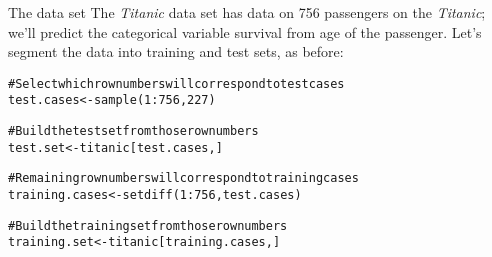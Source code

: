 \documentclass{beamer}\usepackage[]{graphicx}\usepackage[]{color}
\makeatletter
\newcommand{\hlnum}[1]{\textcolor[rgb]{0.824,0.412,0.118}{#1}}%
\newcommand{\hlstr}[1]{\textcolor[rgb]{1,0.894,0.71}{#1}}%
\newcommand{\hlcom}[1]{\textcolor[rgb]{0.824,0.706,0.549}{#1}}%
\newcommand{\hlopt}[1]{\textcolor[rgb]{1,0.894,0.769}{#1}}%
\newcommand{\hlstd}[1]{\textcolor[rgb]{1,0.894,0.769}{#1}}%
\newcommand{\hlkwb}[1]{\textcolor[rgb]{0.804,0.776,0.451}{#1}}%
\newcommand{\hlkwc}[1]{\textcolor[rgb]{0.78,0.941,0.545}{#1}}%
\newcommand{\hlkwd}[1]{\textcolor[rgb]{1,0.78,0.769}{#1}}%
\newenvironment{kframe}{%
 \def\at@end@of@kframe{}%
 \ifinner\ifhmode%
  \def\at@end@of@kframe{\end{minipage}}%
  \begin{minipage}{\columnwidth}%
 \fi\fi%
 \def\FrameCommand##1{\hskip\@totalleftmargin \hskip-\fboxsep
 \colorbox{shadecolor}{##1}\hskip-\fboxsep
     \hskip-\linewidth \hskip-\@totalleftmargin \hskip\columnwidth}%
 \MakeFramed {\advance\hsize-\width
   \@totalleftmargin\z@ \linewidth\hsize
   \@setminipage}}%
 {\par\unskip\endMakeFramed%
 \at@end@of@kframe}
\newenvironment{knitrout}{}{} %
\makeatother
\begin{document}
\begin{darkframes}
    \begin{frame}[fragile]{The data set}
      The \emph{Titanic} data set has data on 756 passengers on the \emph{Titanic}; we'll predict the categorical variable survival from age of the passenger.  Let's segment the data into training and test sets, as before:

      \fontsm
\begin{knitrout}
\begin{kframe}
\begin{alltt}
\hlcom{# Select which row numbers will correspond to test cases}
\hlstd{test.cases} \hlkwb{<-} \hlkwd{sample}\hlstd{(}\hlnum{1}\hlopt{:}\hlnum{756}\hlstd{,} \hlnum{227}\hlstd{)}

\hlcom{# Build the test set from those row numbers}
\hlstd{test.set} \hlkwb{<-} \hlstd{titanic[test.cases,]}

\hlcom{# Remaining row numbers will correspond to training cases}
\hlstd{training.cases} \hlkwb{<-} \hlkwd{setdiff}\hlstd{(}\hlnum{1}\hlopt{:}\hlnum{756}\hlstd{, test.cases)}

\hlcom{# Build the training set from those row numbers}
\hlstd{training.set} \hlkwb{<-} \hlstd{titanic[training.cases,]}
\end{alltt}
\end{kframe}
\end{knitrout}
    \end{frame}

\end{darkframes}
\end{document}
